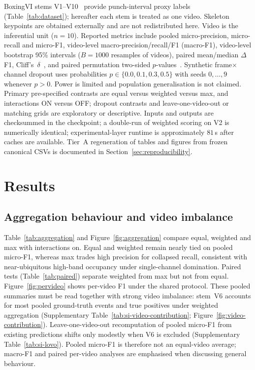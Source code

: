 \documentclass[preprint,12pt,numbers,sort&compress]{elsarticle}
\begin{document}
BoxingVI stems V1--V10~\cite{kumar2025boxingvi} provide punch-interval proxy labels (Table~\ref{tab:dataset}); hereafter each stem is treated as one video.
Skeleton keypoints are obtained externally and are not redistributed here.
Video is the inferential unit ($n{=}10$).
Reported metrics include pooled micro-precision, micro-recall and micro-F1, video-level macro-precision/recall/F1 (macro-F1), video-level bootstrap 95\% intervals ($B{=}1000$ resamples of videos), paired mean/median $\Delta$F1, Cliff's~$\delta$~\cite{cliff1993dominance}, and paired permutation two-sided $p$-values~\cite{efron1994introduction}.
Synthetic frame$\times$channel dropout uses probabilities $p\in\{0.0,0.1,0.3,0.5\}$ with seeds $0,\ldots,9$ whenever $p{>}0$.
Power is limited and population generalisation is not claimed.
Primary pre-specified contrasts are equal versus weighted versus max, and interactions ON versus OFF; dropout contrasts and leave-one-video-out or matching grids are exploratory or descriptive.
Inputs and outputs are checksummed in the checkpoint; a double-run of weighted scoring on V2 is numerically identical; experimental-layer runtime is approximately $81$\,s after caches are available.
Tier~A regeneration of tables and figures from frozen canonical CSVs is documented in Section~\ref{sec:reproducibility}.



\section{Results}
\label{sec:results}

\subsection{Aggregation behaviour and video imbalance}
\label{sec:res-agg}
\label{sec:res-v6}

Table~\ref{tab:aggregation} and Figure~\ref{fig:aggregation} compare equal, weighted and max with interactions on.
Equal and weighted remain nearly tied on pooled micro-F1, whereas max trades high precision for collapsed recall, consistent with near-ubiquitous high-band occupancy under single-channel domination.
Paired tests (Table~\ref{tab:paired}) separate weighted from max but not from equal.
Figure~\ref{fig:pervideo} shows per-video F1 under the shared protocol.
These pooled summaries must be read together with strong video imbalance: stem~V6 accounts for most pooled ground-truth events and true positives under weighted aggregation (Supplementary Table~\ref{tab:si-video-contribution}; Figure~\ref{fig:video-contribution}).
Leave-one-video-out recomputation of pooled micro-F1 from existing predictions shifts only modestly when V6 is excluded (Supplementary Table~\ref{tab:si-lovo}).
Pooled micro-F1 is therefore not an equal-video average; macro-F1 and paired per-video analyses are emphasised when discussing general behaviour.
\end{document}
